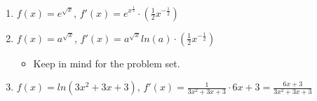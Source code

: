 \begin{enumerate}
\begin{itemize}
    \end{itemize}
    \item $f(x) = e^{\sqrt{x}}$, 
    $f'(x) = e^{x^{\frac{1}{2}}} \cdot (\frac{1}{2}x^{-\frac{1}{2}})$
    \item $f(x) = a^{\sqrt{x}}$, 
    $f'(x) = a^{\sqrt{x}}ln(a) \cdot (\frac{1}{2}x^{-\frac{1}{2}})$
    \begin{itemize}
        \item Keep in mind for the problem set.
    \end{itemize}
    \item $f(x) = ln(3x^2 + 3x + 3)$,
    $f'(x) = \frac{1}{3x^2 + 3x + 3} \cdot 6x + 3 = 
    \frac{6x + 3}{3x^2 + 3x + 3}$
\end{enumerate}